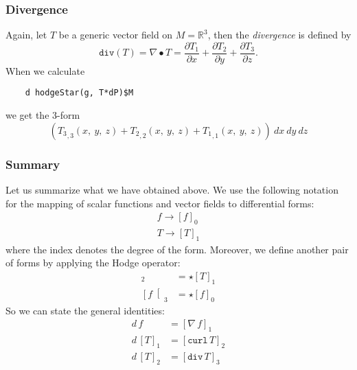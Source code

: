 \documentclass[12pt,a4paper]{article}
\newcommand{\RR}[1]{\mathbb{R}^{#1}}
\begin{document}
\subsubsection{Divergence} 
Again, let $T$ be a generic vector field on $M={\RR 3}$, then the
{\it divergence} is defined by
\begin{displaymath}
   \mathtt{div}(T) = \nabla \bullet T =
   \frac{\partial T_1}{\partial x} +
   \frac{\partial T_2}{\partial y} +
   \frac{\partial T_3}{\partial z}.
\end{displaymath}
When we calculate
\begin{lstlisting}
    d hodgeStar(g, T*dP)$M
\end{lstlisting}
we get the 3-form
\begin{displaymath}
    {\left( {{{T _ {3}} _ {{,3}}}
    \left({x, \: y, \: z}\right)}+{{{T_ {2}} _ {{,2}}}
    \left({x, \: y, \: z}\right)}+{{{T_ {1}} _ {{,1}}}
    \left({x, \: y, \: z}\right)}\right)}\  dx \  dy \  dz
\end{displaymath}
%
\subsubsection{Summary}\label{summvc}
Let us summarize what we have obtained above. We use the following notation
for the mapping of scalar functions and vector fields to differential forms:
\begin{eqnarray*}
    f \rightarrow [f]_0 \\
    T \rightarrow [T]_1 
\end{eqnarray*}
where the index denotes the degree of the form. Moreover, we define another
pair of forms by applying the Hodge operator:
\begin{eqnarray*}
    [T]_2 &= \star [T]_1 \\
    \left[f\right[_3 &= \star [f]_0
\end{eqnarray*}
So we can state the general identities:
\begin{eqnarray*}
    d\,f &= [\nabla\,f]_1 \\
    d\,[T]_1 &= [\mathtt{curl}\,T]_2 \\
    d\,[T]_2 &= [\mathtt{div}\,T]_3
\end{eqnarray*}
%
\end{document}
